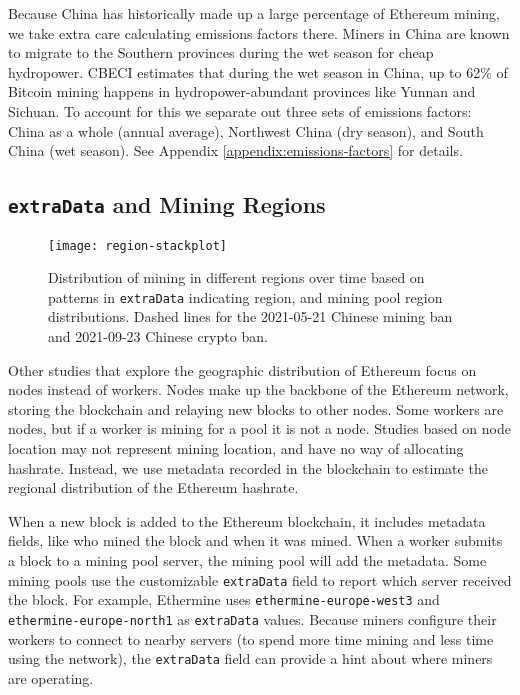 Because China has historically made up a large percentage of Ethereum mining, we take extra care calculating emissions factors there. Miners in China are known to migrate to the Southern provinces during the wet season for cheap hydropower. CBECI estimates that during the wet season in China, up to 62\% of Bitcoin mining happens in hydropower-abundant provinces like Yunnan and Sichuan. To account for this we separate out three sets of emissions factors: China as a whole (annual average), Northwest China (dry season), and South China (wet season). See Appendix \ref{appendix:emissions-factors} for details.

\subsection{\texttt{extraData} and Mining Regions}

\begin{figure*}[htp]
    \centering
    \texttt{[image: region-stackplot]}
    \caption{Distribution of mining in different regions over time based on patterns in \texttt{extraData} indicating region, and mining pool region distributions. Dashed lines for the 2021-05-21 Chinese mining ban\cite{pan_bitcoin_2021} and 2021-09-23 Chinese crypto ban\cite{gkritsi_china_2021}.}
    \label{fig:region-stackplot}
\end{figure*}

Other studies\cite{anderson_new_2016}\cite{kim_measuring_2018}\cite{etherscanio_ethereum_2021} that explore the geographic distribution of Ethereum focus on nodes instead of workers. Nodes make up the backbone of the Ethereum network, storing the blockchain and relaying new blocks to other nodes. Some workers are nodes, but if a worker is mining for a pool it is not a node. Studies based on node location may not represent mining location, and have no way of allocating hashrate. Instead, we use metadata recorded in the blockchain to estimate the regional distribution of the Ethereum hashrate.

When a new block is added to the Ethereum blockchain, it includes metadata fields, like who mined the block and when it was mined. When a worker submits a block to a mining pool server, the mining pool will add the metadata. Some mining pools use the customizable \texttt{extraData} field to report which server received the block. For example, Ethermine uses \texttt{ethermine-europe-west3} and \texttt{ethermine-europe-north1} as \texttt{extraData} values. Because miners configure their workers to connect to nearby servers (to spend more time mining and less time using the network), the \texttt{extraData} field can provide a hint about where miners are operating.

